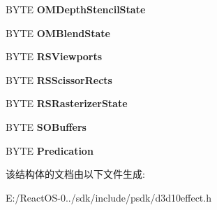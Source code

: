 \begin{DoxyCompactItemize}
B\+Y\+TE {\bfseries O\+M\+Depth\+Stencil\+State}
\item 
\mbox{\label{struct___d3_d10___s_t_a_t_e___b_l_o_c_k___m_a_s_k_a5547e8c388769531fc29ac6aac18b371}} 
B\+Y\+TE {\bfseries O\+M\+Blend\+State}
\item 
\mbox{\label{struct___d3_d10___s_t_a_t_e___b_l_o_c_k___m_a_s_k_a01e347200b4168ed92f090ba3b120c94}} 
B\+Y\+TE {\bfseries R\+S\+Viewports}
\item 
\mbox{\label{struct___d3_d10___s_t_a_t_e___b_l_o_c_k___m_a_s_k_a7e160dfc795702ab13eb4a986d733569}} 
B\+Y\+TE {\bfseries R\+S\+Scissor\+Rects}
\item 
\mbox{\label{struct___d3_d10___s_t_a_t_e___b_l_o_c_k___m_a_s_k_abc8255980e921173c14fe1987ae09f4f}} 
B\+Y\+TE {\bfseries R\+S\+Rasterizer\+State}
\item 
\mbox{\label{struct___d3_d10___s_t_a_t_e___b_l_o_c_k___m_a_s_k_ac08d12ab61eced90d83b2b8ce9f2eb51}} 
B\+Y\+TE {\bfseries S\+O\+Buffers}
\item 
\mbox{\label{struct___d3_d10___s_t_a_t_e___b_l_o_c_k___m_a_s_k_a0b5530109e057c65ec7c0805d22af312}} 
B\+Y\+TE {\bfseries Predication}
\end{DoxyCompactItemize}


该结构体的文档由以下文件生成\+:\begin{DoxyCompactItemize}
\item 
E\+:/\+React\+O\+S-\/0../sdk/include/psdk/d3d10effect.\+h\end{DoxyCompactItemize}
